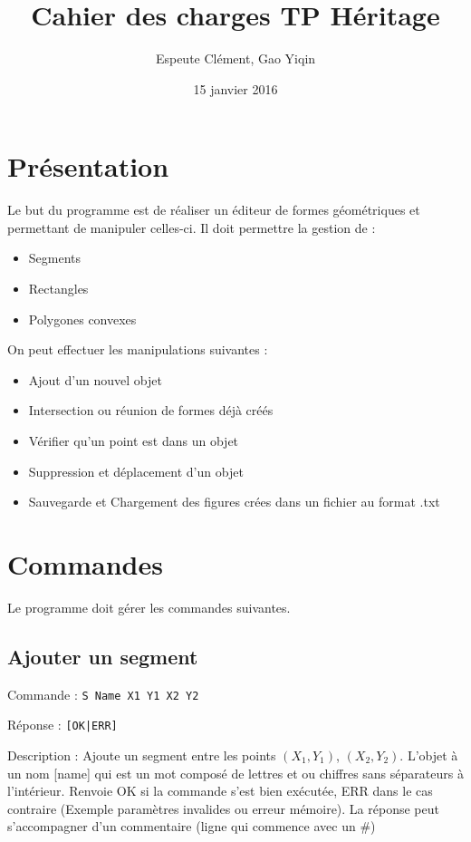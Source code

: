 \documentclass[11pt]{article}
\title{Cahier des charges TP Héritage}
\author{{\sc Espeute} Clément, {\sc Gao} Yiqin}
\date{15 janvier 2016}
\begin{document}
\maketitle

\section{Présentation}

Le but du programme est de réaliser un éditeur de formes géométriques et permettant de manipuler celles-ci. Il doit permettre la gestion de :
\begin{itemize}
	\item Segments
	\item Rectangles
	\item Polygones convexes
\end{itemize}

On peut effectuer les manipulations suivantes :

\begin{itemize}
	\item Ajout d'un nouvel objet
	\item Intersection ou réunion de formes déjà créés
	\item Vérifier qu'un point est dans un objet
	\item Suppression et déplacement d'un objet
	\item Sauvegarde et Chargement des figures crées dans un fichier au format .txt
\end{itemize}

\section{Commandes}
Le programme doit gérer les commandes suivantes.

\subsection{Ajouter un segment}
Commande : \texttt{S Name X1 Y1 X2 Y2}

Réponse : \texttt{[OK|ERR]}

Description : 
Ajoute un segment entre les points $(X_1,Y_1)$, $(X_2,Y_2)$. L'objet à un nom [name] qui est un mot composé de lettres et ou chiffres sans séparateurs à l'intérieur. Renvoie OK si la commande s'est bien exécutée, ERR dans le cas contraire (Exemple paramètres invalides ou erreur mémoire). La réponse peut s’accompagner d'un commentaire (ligne qui commence avec un \#)
\end{document}
